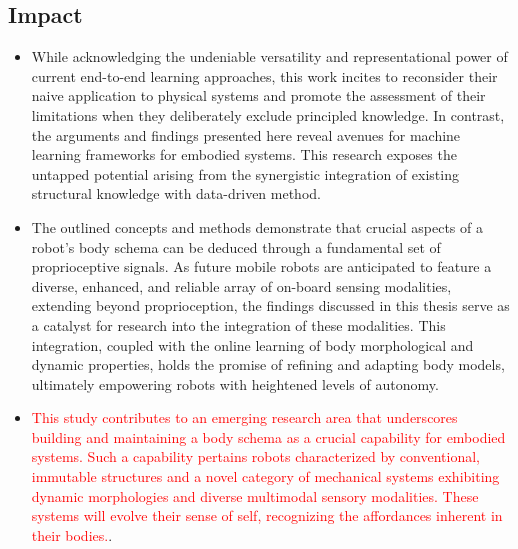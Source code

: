 \documentclass[12pt, a4paper]{article}
\newcommand{\redtext}[1]{\textcolor{red}{#1}}
\begin{document}
\subsection*{Impact}

\begin{itemize}
	
	\item While acknowledging the undeniable versatility and representational power of current end-to-end learning approaches, this work incites to reconsider their naive application to physical systems and promote the assessment of their limitations when they deliberately exclude principled knowledge. In contrast, the arguments and findings presented here reveal avenues for machine learning frameworks for embodied systems. This research exposes the untapped potential arising from the synergistic integration of existing structural knowledge with data-driven method.
		
	\item The outlined concepts and methods demonstrate that crucial aspects of a robot's body schema can be deduced through a fundamental set of proprioceptive signals. As future mobile robots are anticipated to feature a diverse, enhanced, and reliable array of on-board sensing modalities, extending beyond proprioception, the findings discussed in this thesis serve as a catalyst for research into the integration of these modalities. This integration, coupled with the online learning of body morphological and dynamic properties, holds the promise of refining and adapting body models, ultimately empowering robots with heightened levels of autonomy.

	\item \redtext{This study contributes to an emerging research area that underscores building and maintaining a body schema as a crucial capability for embodied systems. Such a capability pertains robots characterized by conventional, immutable structures and a novel category of mechanical systems exhibiting dynamic morphologies and diverse multimodal sensory modalities. These systems will evolve their sense of self, recognizing the affordances inherent in their bodies.}.
		

\end{itemize}
\end{document}
